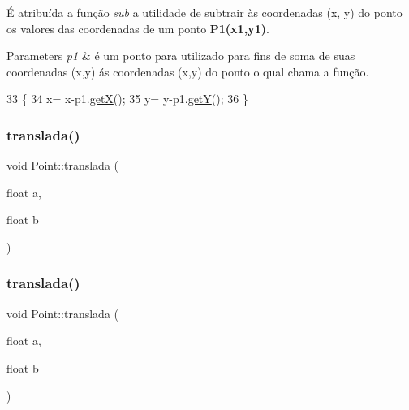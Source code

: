 É atribuída a função {\itshape sub} a utilidade de subtrair às coordenadas (x, y) do ponto os valores das coordenadas de um ponto {\bfseries P1(x1,y1)}. 


\begin{DoxyParams}{Parameters}
{\em p1} & é um ponto para utilizado para fins de soma de suas coordenadas (x,y) ás coordenadas (x,y) do ponto o qual chama a função. \\
\hline
\end{DoxyParams}

\begin{DoxyCode}
33                        \{
34      x= x-p1.\hyperlink{class_point_acc27466778cc87a662bba40268c4c0c8}{getX}();
35      y= y-p1.\hyperlink{class_point_a3cccbca94719ddde353cce86ce0e2f64}{getY}();
36 \}
\end{DoxyCode}
\mbox{\label{class_point_ad9676e36f3444534b609e3c68422239a}} 
\subsubsection{\texorpdfstring{translada()}{translada()}\hspace{0.1cm}{\footnotesize\ttfamily [1/2]}}
{\footnotesize\ttfamily void Point\+::translada (\begin{DoxyParamCaption}\item[{float}]{a,  }\item[{float}]{b }\end{DoxyParamCaption})}

\mbox{\label{class_point_ad9676e36f3444534b609e3c68422239a}} 
\subsubsection{\texorpdfstring{translada()}{translada()}\hspace{0.1cm}{\footnotesize\ttfamily [2/2]}}
{\footnotesize\ttfamily void Point\+::translada (\begin{DoxyParamCaption}\item[{float}]{a,  }\item[{float}]{b }\end{DoxyParamCaption})}



